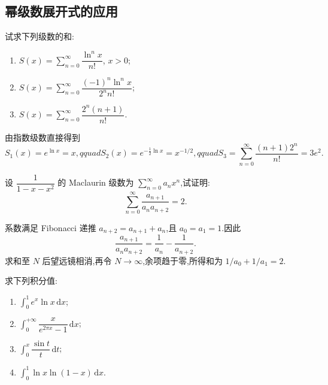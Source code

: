 \subsection{幂级数展开式的应用}



\begin{example}
    试求下列级数的和:
    \begin{enumerate}
        \item $\displaystyle S(x)=\sum\limits_{n=0}^{\infty}\dfrac{\ln^n x}{n!}$, $x>0$;
        \item $\displaystyle S(x)=\sum\limits_{n=0}^{\infty}\dfrac{(-1)^n\ln^n x}{2^n n!}$;
        \item $\displaystyle S(x)=\sum\limits_{n=0}^{\infty}\dfrac{2^n(n+1)}{n!}$.
    \end{enumerate}
\end{example}
\exampleblank

\begin{solution}
    由指数级数直接得到
    \[
        S_1(x)=e^{\ln x}=x,qquad
        S_2(x)=e^{-\frac{1}{2}\ln x}=x^{-1/2},qquad
        S_3=\sum\limits_{n=0}^{\infty}\dfrac{(n+1)2^n}{n!}=3e^2.
    \]
\end{solution}

\begin{example}
    设 $\dfrac{1}{1-x-x^2}$ 的 Maclaurin 级数为 $\displaystyle\sum\limits_{n=0}^{\infty}a_nx^n$,试证明:
    \[
        \sum\limits_{n=0}^{\infty}\dfrac{a_{n+1}}{a_na_{n+2}}=2.
    \]
\end{example}
\exampleblank

\begin{solution}
    系数满足 Fibonacci 递推 $a_{n+2}=a_{n+1}+a_n$,且 $a_0=a_1=1$.因此
    \[
        \dfrac{a_{n+1}}{a_na_{n+2}}
        =\dfrac{1}{a_n}-\dfrac{1}{a_{n+2}}.
    \]
    求和至 $N$ 后望远镜相消,再令 $N\to\infty$,余项趋于零,所得和为
    $1/a_0+1/a_1=2$.
\end{solution}




\begin{example}
    求下列积分值:
    \begin{enumerate}
        \item $\displaystyle\int_0^1e^x\ln x\,\mathrm{d}x$;
        \item $\displaystyle\int_0^{+\infty}\dfrac{x}{e^{2\pi x}-1}\,\mathrm{d}x$;
        \item $\displaystyle\int_0^x\dfrac{\sin t}{t}\,\mathrm{d}t$;
        \item $\displaystyle\int_0^1\ln x\ln(1-x)\,\mathrm{d}x$.
    \end{enumerate}
\end{example}
\exampleblank

